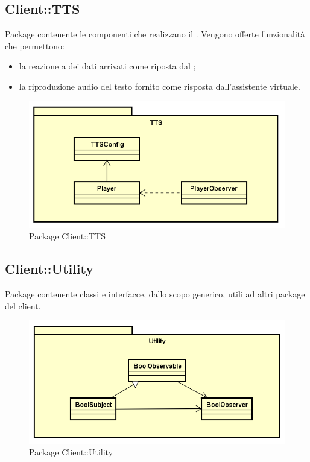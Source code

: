 \subsection{Client::TTS}
Package contenente le componenti che realizzano il . Vengono offerte funzionalità che permettono: \begin{itemize} \item la reazione a dei dati arrivati come riposta dal ; \item la riproduzione audio del testo fornito come risposta dall'assistente virtuale. \end{itemize}
\begin{figure}[h] \centering \includegraphics[width=\textwidth,height=\textheight,keepaspectratio]{images/diagrams/client/Client/TTS.png}
\caption{Package Client::TTS}
\end{figure}
\newpage


\subsection{Client::Utility}
Package contenente classi e interfacce, dallo scopo generico, utili ad altri package del client.
\begin{figure}[h] \centering \includegraphics[width=\textwidth,height=\textheight,keepaspectratio]{images/diagrams/client/Client/Utility.png}
\caption{Package Client::Utility}
\end{figure}
\newpage